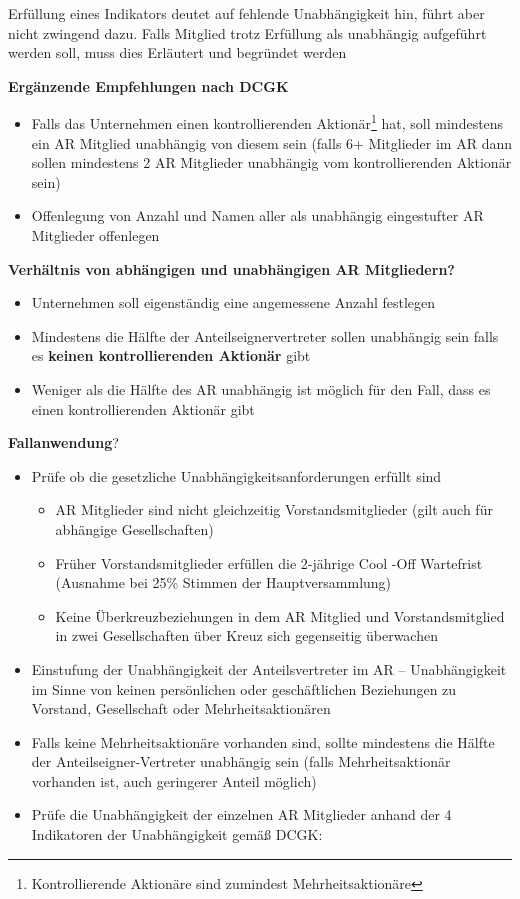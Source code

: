 \documentclass[
]{article}
\providecommand{\tightlist}{%
  \setlength{\itemsep}{0pt}\setlength{\parskip}{0pt}}
\begin{document}
Erfüllung eines Indikators deutet auf fehlende Unabhängigkeit hin, führt
aber nicht zwingend dazu. Falls Mitglied trotz Erfüllung als unabhängig
aufgeführt werden soll, muss dies Erläutert und begründet werden

\textbf{Ergänzende Empfehlungen nach DCGK}

\begin{itemize}
\tightlist
\item
  Falls das Unternehmen einen kontrollierenden Aktionär\footnote{Kontrollierende
    Aktionäre sind zumindest Mehrheitsaktionäre} hat, soll mindestens
  ein AR Mitglied unabhängig von diesem sein (falls 6+ Mitglieder im AR
  dann sollen mindestens 2 AR Mitglieder unabhängig vom kontrollierenden
  Aktionär sein)
\item
  Offenlegung von Anzahl und Namen aller als unabhängig eingestufter AR
  Mitglieder offenlegen
\end{itemize}

\textbf{Verhältnis von abhängigen und unabhängigen AR Mitgliedern?}

\begin{itemize}
\tightlist
\item
  Unternehmen soll eigenständig eine angemessene Anzahl festlegen
\item
  Mindestens die Hälfte der Anteilseignervertreter sollen unabhängig
  sein falls es \textbf{keinen kontrollierenden Aktionär} gibt
\item
  Weniger als die Hälfte des AR unabhängig ist möglich für den Fall,
  dass es einen kontrollierenden Aktionär gibt
\end{itemize}

\textbf{Fallanwendung}?

\begin{itemize}
\item
  Prüfe ob die gesetzliche Unabhängigkeitsanforderungen erfüllt sind

  \begin{itemize}
  \tightlist
  \item
    AR Mitglieder sind nicht gleichzeitig Vorstandsmitglieder (gilt auch
    für abhängige Gesellschaften)
  \item
    Früher Vorstandsmitglieder erfüllen die 2-jährige Cool -Off
    Wartefrist (Ausnahme bei 25\% Stimmen der Hauptversammlung)
  \item
    Keine Überkreuzbeziehungen in dem AR Mitglied und Vorstandsmitglied
    in zwei Gesellschaften über Kreuz sich gegenseitig überwachen
  \end{itemize}
\item
  Einstufung der Unabhängigkeit der Anteilsvertreter im AR --
  Unabhängigkeit im Sinne von keinen persönlichen oder geschäftlichen
  Beziehungen zu Vorstand, Gesellschaft oder Mehrheitsaktionären
\item
  Falls keine Mehrheitsaktionäre vorhanden sind, sollte mindestens die
  Hälfte der Anteilseigner-Vertreter unabhängig sein (falls
  Mehrheitsaktionär vorhanden ist, auch geringerer Anteil möglich)
\item
  Prüfe die Unabhängigkeit der einzelnen AR Mitglieder anhand der 4
  Indikatoren der Unabhängigkeit gemäß DCGK:
\end{itemize}
\end{document}
